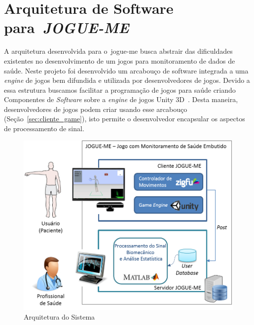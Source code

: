 \chapter{Arquitetura de Software para~\textit{JOGUE-ME}}\label{chapter:arquitetura_captura}

A arquitetura desenvolvida para o~\ac{jogue-me} busca abstrair das dificuldades existentes no desenvolvimento de um jogos para monitoramento de dados de saúde. Neste projeto foi desenvolvido um arcabouço de software integrada a uma \textit{engine} de jogos bem difundida e utilizada por desenvolvedores de jogos. Devido a essa estrutura buscamos facilitar a programação de jogos para saúde criando Componentes de \textit{Software} sobre a \textit{engine} de jogos Unity 3D~\cite{unity3d}. Desta maneira, desenvolvedores de jogos podem criar  usando esse arcabouço (Seção~\ref{sec:cliente_game}), isto permite o desenvolvedor encapsular os aspectos de processamento de sinal. 


\begin{figure}[!htbp]
 \centering
  \includegraphics[scale=0.8]{./img/visaosistema.png}
\caption[Extensão da Arquitetura do Sistema ]{Arquitetura do Sistema}
 \label{fig:arquitetura}
\end{figure}

